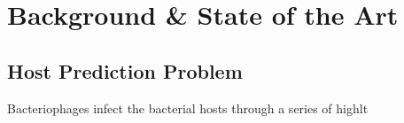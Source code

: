\section{Background \& State of the Art}

\subsection{Host Prediction Problem}
Bacteriophages infect the bacterial hosts through a series of highlt






